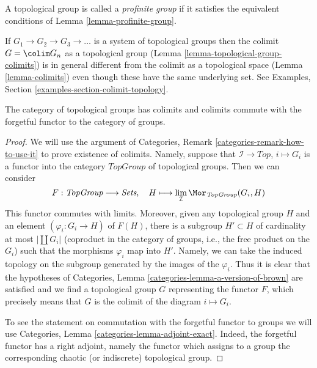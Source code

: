 \begin{definition}
\label{definition-profinite-group}
A topological group is called a {\it profinite group} if it satisfies
the equivalent conditions of Lemma \ref{lemma-profinite-group}.
\end{definition}

\noindent
If $G_1 \to G_2 \to G_3 \to \ldots$ is a system of topological groups
then the colimit $G = \colim G_n$ as a topological group
(Lemma \ref{lemma-topological-group-colimits}) is in general different
from the colimit as a topological space (Lemma \ref{lemma-colimits})
even though these have the same underlying set. See
Examples, Section \ref{examples-section-colimit-topology}.

\begin{lemma}
\label{lemma-topological-group-colimits}
The category of topological groups has colimits and colimits commute
with the forgetful functor to the category of groups.
\end{lemma}

\begin{proof}
We will use the argument of
Categories, Remark \ref{categories-remark-how-to-use-it} to prove
existence of colimits. Namely, suppose
that $\mathcal{I} \to \textit{Top}$, $i \mapsto G_i$ is a functor
into the category $\textit{TopGroup}$ of topological groups.
Then we can consider
$$
F : \textit{TopGroup} \longrightarrow \textit{Sets},\quad
H \longmapsto \lim_\mathcal{I} \Mor_{\textit{TopGroup}}(G_i, H)
$$
This functor commutes with limits. Moreover, given any topological group
$H$ and an element $(\varphi_i : G_i \to H)$ of $F(H)$, there is
a subgroup $H' \subset H$ of cardinality at most $|\coprod G_i|$
(coproduct in the category of groups, i.e., the free product on the $G_i$)
such that the morphisms $\varphi_i$ map into $H'$. Namely, we can
take the induced topology on the subgroup generated by the images
of the $\varphi_i$. Thus it is clear that the hypotheses of
Categories, Lemma \ref{categories-lemma-a-version-of-brown}
are satisfied and we find a topological group $G$
representing the functor $F$, which precisely means that $G$ is
the colimit of the diagram $i \mapsto G_i$.

\medskip\noindent
To see the statement on commutation with the forgetful functor to
groups we will use
Categories, Lemma \ref{categories-lemma-adjoint-exact}.
Indeed, the forgetful functor has a right adjoint, namely the functor which
assigns to a group the corresponding chaotic (or indiscrete) topological group.
\end{proof}

